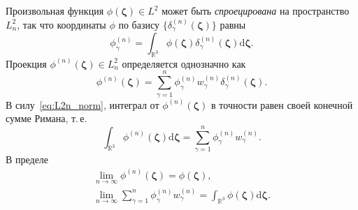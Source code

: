 \documentclass{article}
\newcommand{\dd}{\mathrm{d}}
\newcommand{\dzeta}{\boldsymbol{\dd\zeta}}
\newcommand{\bzeta}{\boldsymbol{\zeta}}
\begin{document}
Произвольная функция \(\phi(\bzeta) \in L^2\) может быть \emph{спроецирована} на пространство \(L^2_n\),
так что координаты \(\phi\) по базису \(\{\delta^{(n)}_\gamma(\bzeta)\}\) равны
\begin{equation}\label{eq:L2n_coords}
    \phi^{(n)}_\gamma = \int_{\mathbb{R}^3} \phi(\bzeta) \delta^{(n)}_\gamma(\bzeta) \dzeta.
\end{equation}
Проекция \(\phi^{(n)}(\bzeta) \in L^2_n\) определяется однозначно как
\begin{equation}\label{eq:L2n_expansion}
    \phi^{(n)}(\bzeta) = \sum_{\gamma=1}^n \phi^{(n)}_\gamma w^{(n)}_\gamma \delta^{(n)}_\gamma(\bzeta).
\end{equation}
В силу~\eqref{eq:L2n_norm}, интеграл от \(\phi^{(n)}(\bzeta)\) в точности равен своей конечной сумме Римана, т.\,е.
\begin{equation}\label{eq:Riemann_sum}
    \int_{\mathbb{R}^3} \phi^{(n)}(\bzeta) \dzeta = \sum_{\gamma=1}^n \phi^{(n)}_\gamma w^{(n)}_\gamma.
\end{equation}
В пределе
\begin{gather}
    \lim_{n\to\infty} \phi^{(n)}(\bzeta) = \phi(\bzeta), \label{function_limit}\\
    \lim_{n\to\infty} \sum_{\gamma=1}^n \phi^{(n)}_\gamma w^{(n)}_\gamma =
        \int_{\mathbb{R}^3} \phi(\bzeta) \dzeta. \label{eq:Riemann_sum_limit}
\end{gather}
\end{document}
